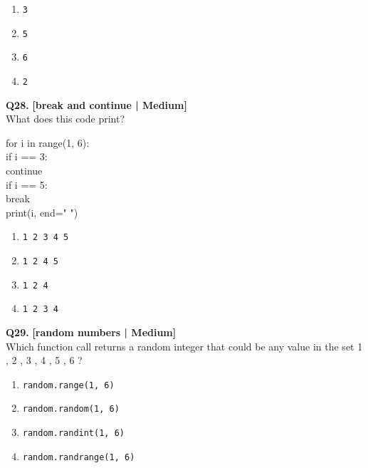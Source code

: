 \begin{enumerate}[label=(\alph*),topsep=2pt,itemsep=1pt,partopsep=0pt,parsep=0pt]
    \item \relax \texttt{3}
    \item \relax \texttt{5}
    \item \relax \texttt{6}
    \item \relax \texttt{2}
\end{enumerate}
\vspace{2mm}

\noindent\textbf{Q28.} \hfill {\small\color{LPUOrange}\textbf{[break and continue | Medium]}}\\[2pt]
What does this code print? 

\begin{pycode}
for i in range(1, 6):\\
if i == 3:\\
continue\\
if i == 5:\\
break\\
print(i, end=" ")
\end{pycode}

\begin{enumerate}[label=(\alph*),topsep=2pt,itemsep=1pt,partopsep=0pt,parsep=0pt]
    \item \relax \texttt{1 2 3 4 5}
    \item \relax \texttt{1 2 4 5}
    \item \relax \texttt{1 2 4}
    \item \relax \texttt{1 2 3 4}
\end{enumerate}
\vspace{2mm}

\noindent\textbf{Q29.} \hfill {\small\color{LPUOrange}\textbf{[random numbers | Medium]}}\\[2pt]
Which function call returns a random integer that could be any value in the set { 1 , 2 , 3 , 4 , 5 , 6 } ?

\begin{enumerate}[label=(\alph*),topsep=2pt,itemsep=1pt,partopsep=0pt,parsep=0pt]
    \item \relax \texttt{random.range(1, 6)}
    \item \relax \texttt{random.random(1, 6)}
    \item \relax \texttt{random.randint(1, 6)}
    \item \relax \texttt{random.randrange(1, 6)}
\end{enumerate}
\vspace{2mm}

